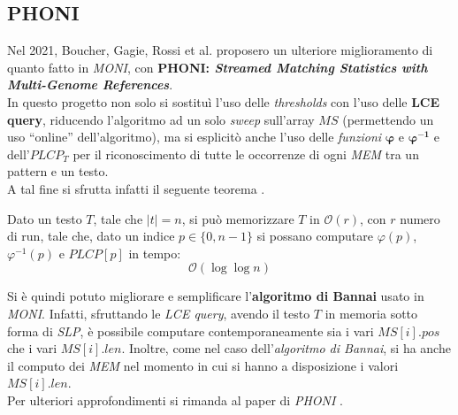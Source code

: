 \subsection{PHONI}
Nel 2021, Boucher, Gagie, Rossi et al. proposero un ulteriore miglioramento di
quanto fatto in \textit{MONI}, con \textbf{PHONI: \textit{Streamed Matching
    Statistics with Multi-Genome References}}.\\
In questo progetto non solo si sostituì l'uso delle \textit{thresholds} con
l'uso delle \textbf{LCE query}, riducendo l'algoritmo ad un solo \textit{sweep}
sull'array $MS$ (permettendo un uso ``online'' dell'algoritmo), ma si
esplicitò anche l'uso delle \textit{funzioni} $\mathbf{\varphi}$ e
$\mathbf{\varphi^{-1}}$ e dell'$PLCP_T$ per il riconoscimento di tutte le
occorrenze di ogni \textit{MEM} tra un pattern e un testo.\\
A tal fine si sfrutta infatti il seguente teorema \cite{gagie2020}.
\begin{teorema}
  Dato un testo $T$, tale che $|t|=n$, si può memorizzare $T$ in
  $\mathcal{O}(r)$, con $r$ numero di run, tale che, dato un indice
  $p\in\{0,n-1\}$ si possano computare $\varphi(p)$, $\varphi^{-1}(p)$ e
  $PLCP[p]$ in tempo:
  \[\mathcal{O}(\log\log n)\]
\end{teorema}
Si è quindi potuto migliorare e semplificare l'\textbf{algoritmo di Bannai}
usato in \textit{MONI}. Infatti, sfruttando le
\textit{LCE query}, avendo il testo $T$ in memoria sotto forma di \textit{SLP},
è possibile computare contemporaneamente sia i vari
$MS[i].pos$ che i vari $MS[i].len$. Inoltre, come nel caso dell'\textit{algoritmo
  di Bannai}, si ha anche il computo dei \textit{MEM} nel momento in cui si
hanno a 
disposizione i valori $MS[i].len$.\\ 
Per ulteriori approfondimenti si rimanda al paper di \textit{PHONI}
\cite{phoni}.
